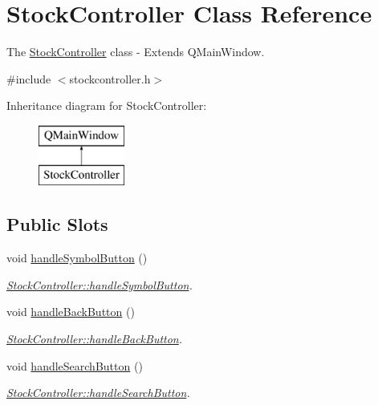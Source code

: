 \hypertarget{class_stock_controller}{}\section{Stock\+Controller Class Reference}
\label{class_stock_controller}


The \mbox{\hyperlink{class_stock_controller}{Stock\+Controller}} class -\/ Extends Q\+Main\+Window.  




{\ttfamily \#include $<$stockcontroller.\+h$>$}

Inheritance diagram for Stock\+Controller\+:\begin{figure}[H]
\begin{center}
\leavevmode
\includegraphics[height=2.000000cm]{class_stock_controller}
\end{center}
\end{figure}
\subsection*{Public Slots}
\begin{DoxyCompactItemize}
\item 
\mbox{\label{class_stock_controller_a7a01bc7118b1649af889cc9e688c1aed}} 
void \mbox{\hyperlink{class_stock_controller_a7a01bc7118b1649af889cc9e688c1aed}{handle\+Symbol\+Button}} ()
\begin{DoxyCompactList}\small\item\em \mbox{\hyperlink{class_stock_controller_a7a01bc7118b1649af889cc9e688c1aed}{Stock\+Controller\+::handle\+Symbol\+Button}}. \end{DoxyCompactList}\item 
\mbox{\label{class_stock_controller_a06a3efb11ff4fff327e2cdea1b1819d1}} 
void \mbox{\hyperlink{class_stock_controller_a06a3efb11ff4fff327e2cdea1b1819d1}{handle\+Back\+Button}} ()
\begin{DoxyCompactList}\small\item\em \mbox{\hyperlink{class_stock_controller_a06a3efb11ff4fff327e2cdea1b1819d1}{Stock\+Controller\+::handle\+Back\+Button}}. \end{DoxyCompactList}\item 
\mbox{\label{class_stock_controller_a78345c4544ced9f455ab28db291b2531}} 
void \mbox{\hyperlink{class_stock_controller_a78345c4544ced9f455ab28db291b2531}{handle\+Search\+Button}} ()
\begin{DoxyCompactList}\small\item\em \mbox{\hyperlink{class_stock_controller_a78345c4544ced9f455ab28db291b2531}{Stock\+Controller\+::handle\+Search\+Button}}. \end{DoxyCompactList}\end{DoxyCompactItemize}
